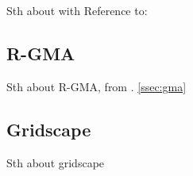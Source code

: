 Sth about with \cite{OCM_1,OCM_2,OCM_3} Reference to: 
\subsection{R-GMA}

Sth about R-GMA, from \cite{RGMA1,RGMA2,RGMA3}. \ref{ssec:gma}

\subsection{Gridscape}

Sth about gridscape \cite{GRIDSCAPE1, GRIDSCAPE2, GRIDSCAPE3}